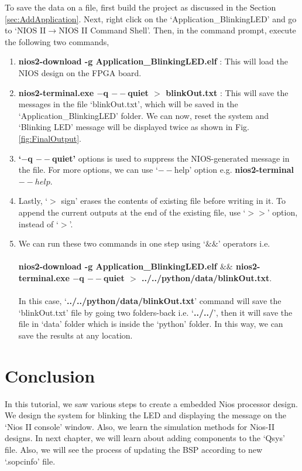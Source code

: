 To save the data on a file, first build the project as discussed in the Section \ref{sec:AddApplication}. Next, right click on the `Application\_BlinkingLED' and go to `NIOS II$\rightarrow$NIOS II Command Shell'. Then, in the command prompt, execute the following two commands, 
\begin{enumerate}
	\item \textbf{nios2-download -g Application\_BlinkingLED.elf}  : This will load the NIOS design on the FPGA board. 
	
	\item \textbf{nios2-terminal.exe $-$q $--$quiet $>$ blinkOut.txt} : This will save the messages in the file `blinkOut.txt', which will be saved in the `Application\_BlinkingLED' folder. We can now, reset the system and `Blinking LED' message will be displayed twice as shown in Fig. \ref{fig:FinalOutput}. 
	\item \textbf{`$-$q $--$quiet'} options is used to suppress the NIOS-generated message in the file. For more options, we can use `$--$help' option e.g. \textbf{nios2-terminal $--help$}. 
	
	\item Lastly, `$>$ sign'  erases the contents of existing file before writing in it. To append the current outputs at the end of the existing file, use `$>>$' option, instead of `$>$'. 
		
	\item We can run these two commands in one step using `$\&\&$'  operators i.e. 
	\\
	\\
	 \textbf{nios2-download -g Application\_BlinkingLED.elf $\&\&$  nios2-terminal.exe $-$q $--$quiet $>$ ../../python/data/blinkOut.txt}.
	 \\
	 \\
	 In this case, `\textbf{../../python/data/blinkOut.txt}' command will save the `blinkOut.txt' file by going two folders-back i.e. `\textbf{../../}', then it will save the file in `data' folder which is inside the `python' folder. In this way, we can save the results at any location. 
	
\end{enumerate}

\section{Conclusion}
In this tutorial, we saw various steps to create a embedded Nios processor design. We design the system for blinking the LED and displaying the message on the `Nios II console' window. Also, we learn the simulation methods for Nios-II designs. In next chapter, we will learn about adding components to the `Qsys' file. Also, we will see the process of updating the BSP according to new `.sopcinfo' file. 